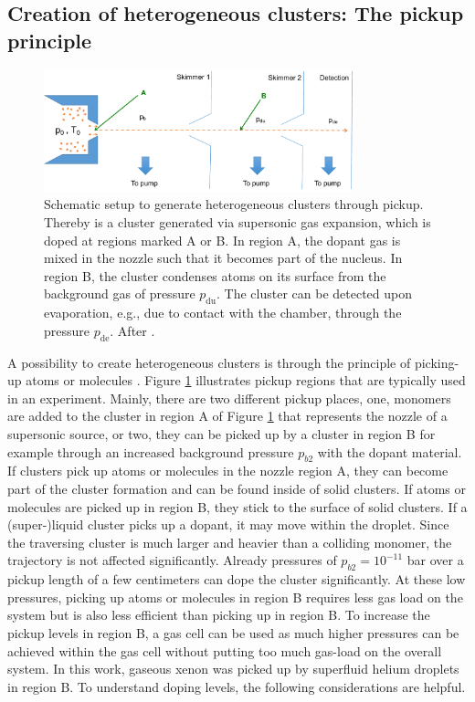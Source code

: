 \subsection{Creation of heterogeneous clusters: The pickup principle}\label{sec:heterogeneous-cluster}
\begin{figure}
	\centering
		\includegraphics[width=0.80\textwidth]{images/pick-up.pdf}
	\caption[Schematic of a pickup (gas-)source.]{Schematic setup to generate heterogeneous clusters through pickup. Thereby is a cluster generated via supersonic gas expansion, which is doped at regions marked A or B. In region A, the dopant gas is mixed in the nozzle such that it becomes part of the nucleus. In region B, the cluster condenses atoms on its surface from the background gas of pressure $p_{\text{du}}$. The cluster can be detected upon evaporation, e.g., due to contact with the chamber, through the pressure $p_{\text{de}}$. After \cite{Gough-1985-JChemPhys,Haberland-1994-Springer}.}
	\label{fig:pickupPrinciple}
\end{figure}
A possibility to create heterogeneous clusters is through the principle of picking-up atoms or molecules \cite{Gough-1985-JChemPhys,Haberland-1994-Springer}. Figure \ref{fig:pickupPrinciple} illustrates pickup regions that are typically used in an experiment. Mainly, there are two different pickup places, one, monomers are added to the cluster in region A of Figure \ref{fig:pickupPrinciple} that represents the nozzle of a supersonic source, or two, they can be picked up by a cluster in region B for example through an increased background pressure $p_{b2}$ with the dopant material. If clusters pick up atoms or molecules in the nozzle region A, they can become part of the cluster formation and can be found inside of solid clusters. If atoms or molecules are picked up in region B, they stick to the surface of solid clusters. If a (super-)liquid cluster picks up a dopant, it may move within the droplet. Since the traversing cluster is much larger and heavier than a colliding monomer, the trajectory is not affected significantly. Already pressures of $p_{b2}=10^{-11}$ bar over a pickup length of a few centimeters can dope the cluster significantly. At these low pressures, picking up atoms or molecules in region B requires less gas load on the system but is also less efficient than picking up in region B. To increase the pickup levels in region B, a gas cell can be used as much higher pressures can be achieved within the gas cell without putting too much gas-load on the overall system. In this work, gaseous xenon was picked up by superfluid helium droplets in region B. To understand doping levels, the following considerations are helpful.\\[1\baselineskip]

